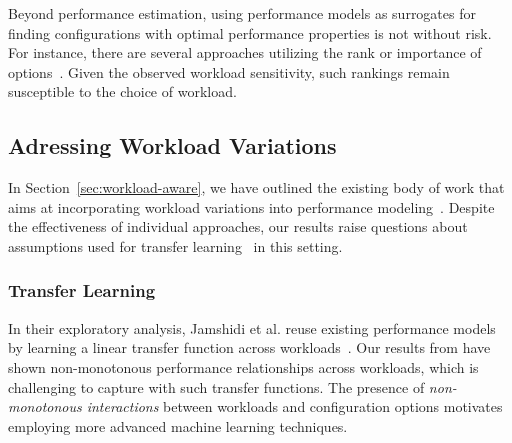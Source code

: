 {{{Beyond performance estimation, using performance models as surrogates for finding configurations with optimal performance properties is not without risk. For instance, there are several approaches utilizing the rank or importance of options~\cite{nairUsingBadLearners2017,ohFindingNearoptimalConfigurations2017}. Given the observed workload sensitivity, such rankings remain susceptible to the choice of workload.

\subsection{Adressing Workload Variations}
In Section~\ref{sec:workload-aware}, we have outlined the existing body of work that aims at incorporating workload variations into performance modeling~\cite{koc_satune_2021,jamishidi_transfer_2017,jamshidi_learning_2018,jamshidi_transfer_gp_2017}. Despite the effectiveness of individual approaches, our results raise questions about assumptions  used for transfer learning~\cite{jamshidi_learning_2018,jamishidi_transfer_2017} in this setting. 

\subsubsection{Transfer Learning} In their exploratory analysis, Jamshidi et al. reuse existing performance models by learning a linear transfer function across workloads~\cite{jamishidi_transfer_2017}. Our results from  have shown non-monotonous performance relationships across workloads, which is challenging to capture with such transfer functions. The presence of \textit{non-monotonous interactions} between workloads and configuration options motivates employing more advanced machine learning techniques. 

}}}

